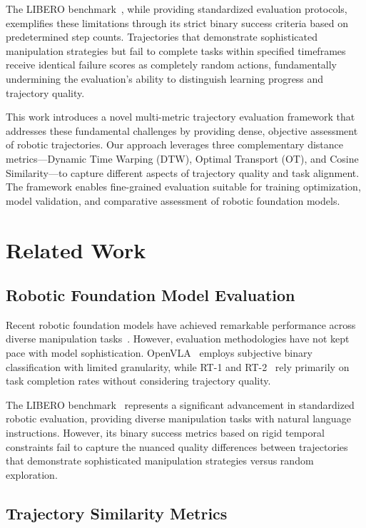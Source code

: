 \documentclass[10pt,twocolumn]{article}
\begin{document}
The LIBERO benchmark~\cite{liu2023libero}, while providing standardized evaluation protocols, exemplifies these limitations through its strict binary success criteria based on predetermined step counts. Trajectories that demonstrate sophisticated manipulation strategies but fail to complete tasks within specified timeframes receive identical failure scores as completely random actions, fundamentally undermining the evaluation's ability to distinguish learning progress and trajectory quality.

This work introduces a novel multi-metric trajectory evaluation framework that addresses these fundamental challenges by providing dense, objective assessment of robotic trajectories. Our approach leverages three complementary distance metrics—Dynamic Time Warping (DTW), Optimal Transport (OT), and Cosine Similarity—to capture different aspects of trajectory quality and task alignment. The framework enables fine-grained evaluation suitable for training optimization, model validation, and comparative assessment of robotic foundation models.

\section{Related Work}

\subsection{Robotic Foundation Model Evaluation}

Recent robotic foundation models have achieved remarkable performance across diverse manipulation tasks~\cite{brohan2023rt2, team2023robotic}. However, evaluation methodologies have not kept pace with model sophistication. OpenVLA~\cite{kim2024openvla} employs subjective binary classification with limited granularity, while RT-1 and RT-2~\cite{brohan2023rt, brohan2023rt2} rely primarily on task completion rates without considering trajectory quality.

The LIBERO benchmark~\cite{liu2023libero} represents a significant advancement in standardized robotic evaluation, providing diverse manipulation tasks with natural language instructions. However, its binary success metrics based on rigid temporal constraints fail to capture the nuanced quality differences between trajectories that demonstrate sophisticated manipulation strategies versus random exploration.

\subsection{Trajectory Similarity Metrics}
\end{document}
